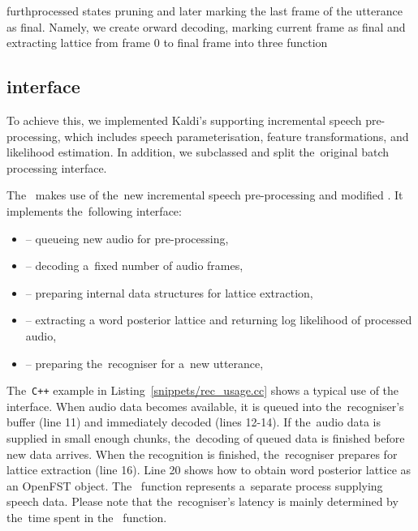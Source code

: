     furthprocessed states  pruning and later marking the last frame of the utterance as final.
    Namely, we create orward decoding, marking current frame as final and extracting lattice from frame 0 to final frame into three function

\subsection{ interface}
\label{sub:verb_c_}

To achieve this, we implemented Kaldi's  supporting incremental speech pre-processing, which includes speech parameterisation, feature transformations, and likelihood estimation.
In addition, we subclassed  and split the~original batch processing interface.

The~ makes use of the~new incremental speech pre-processing and modified .
It implements the~following interface:
\begin{itemize}
\item {} -- queueing new audio for pre-processing,
\item {} -- decoding a~fixed number of audio frames,
\item {} -- preparing internal data structures for lattice extraction,
\item {} -- extracting a word posterior lattice and returning log likelihood of processed audio,
\item {} -- preparing the~recogniser for a~new utterance,
\end{itemize}

The~\verb!C++! example in Listing~\ref{snippets/rec_usage.cc} shows a typical use of the~ interface.
When audio data becomes available, it is queued into the~recogniser's buffer (line 11) and immediately decoded (lines 12-14).
If the~audio data is supplied in small enough chunks, the~decoding of queued data is finished before new data arrives.
When the recognition is finished, the~recogniser prepares for lattice extraction (line 16).
Line 20 shows how to obtain word posterior lattice as an OpenFST object.
The~ function represents a~separate process supplying speech data.
Please note that the~recogniser's latency is mainly determined by the~time spent in the~ function.


